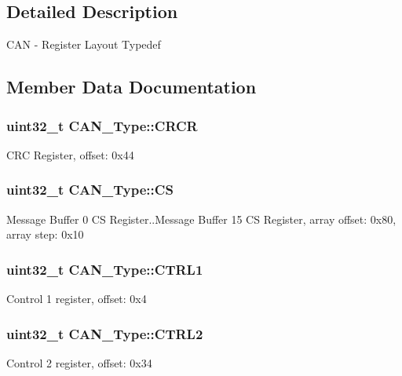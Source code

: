 \subsection{Detailed Description}
C\+AN -\/ Register Layout Typedef 

\subsection{Member Data Documentation}
\subsubsection[{\texorpdfstring{C\+R\+CR}{CRCR}}]{ uint32\+\_\+t C\+A\+N\+\_\+\+Type\+::\+C\+R\+CR}\hypertarget{structCAN__Type_a3f24effa250c1a1f1ff28beaf72939e0}{}\label{structCAN__Type_a3f24effa250c1a1f1ff28beaf72939e0}
C\+RC Register, offset\+: 0x44 
\subsubsection[{\texorpdfstring{CS}{CS}}]{ uint32\+\_\+t C\+A\+N\+\_\+\+Type\+::\+CS}\hypertarget{structCAN__Type_aeadcdf25a47331a7d70efd0817f2f000}{}\label{structCAN__Type_aeadcdf25a47331a7d70efd0817f2f000}
Message Buffer 0 CS Register..Message Buffer 15 CS Register, array offset\+: 0x80, array step\+: 0x10 
\subsubsection[{\texorpdfstring{C\+T\+R\+L1}{CTRL1}}]{ uint32\+\_\+t C\+A\+N\+\_\+\+Type\+::\+C\+T\+R\+L1}\hypertarget{structCAN__Type_a7ae40587a0ab05c822ca101757875904}{}\label{structCAN__Type_a7ae40587a0ab05c822ca101757875904}
Control 1 register, offset\+: 0x4 
\subsubsection[{\texorpdfstring{C\+T\+R\+L2}{CTRL2}}]{ uint32\+\_\+t C\+A\+N\+\_\+\+Type\+::\+C\+T\+R\+L2}\hypertarget{structCAN__Type_a7f5247786c36d727864defd36b8e1056}{}\label{structCAN__Type_a7f5247786c36d727864defd36b8e1056}
Control 2 register, offset\+: 0x34 
